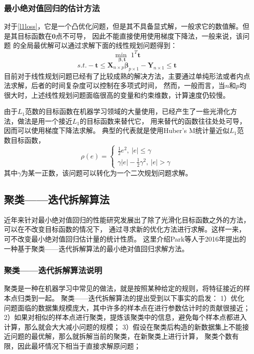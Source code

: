 \subsubsection{最小绝对值回归的估计方法}
对于\eqref{l1loss}，它是一个凸优化问题，但是其不具备显式解，一般求它的数值解。但是其目标函数在$\bm{0}$点不可导，
因此不能直接使用使用梯度下降法，一般来说，该问题
的全局最优解可以通过求解下面的线性规划问题得到：
$$
    \underset{\bm{\beta}, \bm{t}}{\operatorname{min\ }} 1^T \bm{t}
$$
$$
    s.t. -\bm{t} \leq \bm{X}_{n\times p}\bm{\beta}_{p\times1} - \bm{Y}_{n\times 1} \leq \bm{t}
$$
目前对于线性规划问题已经有了比较成熟的解决方法，主要通过单纯形法或者内点法求解，后者的时间复杂度可以控制在多项式时间，
然而，一般而言，当$n$和$p$均很大时，上述线性规划问题面临很高的变量和约束维数，计算速度仍较慢。

由于$L_1$范数的目标函数在机器学习领域的大量使用，已经产生了一些光滑化方法，做法是用一个接近$L_1$的目标函数来替代它，
用来替代的函数往往处处可导，因而可以使用梯度下降法求解。
典型的代表就是使用Huber’s M统计量近似$L_1$范数目标函数，
\begin{equation*}
    \rho(e) = \left\{
        \begin{array}{clr}
            \frac1{2}e^2,\ |e| \leq \gamma \\
            \gamma |e| - \frac1{2}\gamma ^2 ,\ |e| > \gamma
        \end{array}
    \right.
\end{equation*}
其中$\gamma$为某一正数，该问题可以转化为一个二次规划问题求解。

\subsection{聚类——迭代拆解算法}
近年来针对最小绝对值回归的性能研究发展出了除了光滑化目标函数之外的方法，可以在不改变目标函数的情况下，
通过寻求新的优化方法进行求解。这样一来，可不改变最小绝对值回归估计量的统计性质。
这里介绍Park等人于2016年提出的一种基于聚类——迭代拆解算法的最小绝对值回归求解方法。

\subsubsection{聚类——迭代拆解算法说明}
聚类是一种在机器学习中常见的做法，就是按照某种给定的规则，将特征接近的样本点归类到一起。
聚类——迭代拆解算法的提出受到以下事实的启发：
1）优化问题面临的数据集规模庞大，其中许多的样本点在进行参数估计时的贡献很接近；
2）如果对相似的样本点进行聚类，提炼该聚类中的信息，避免每个样本点都进入计算，那么就会大大减小问题的规模；
3）假设在聚类后构造的新数据集上不能接近问题的最优解，那么就拆解当前的聚类，在新聚类上进行计算，
聚类个数有限，因此最坏情况下相当于直接求解原问题；

